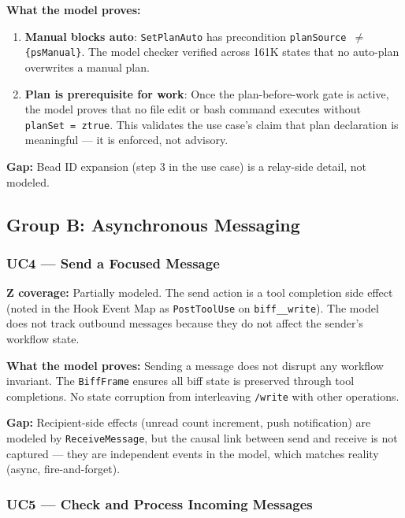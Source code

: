 \documentclass[a4paper,10pt,fleqn]{article}
\begin{document}
\textbf{What the model proves:}

\begin{enumerate}
  \item \textbf{Manual blocks auto}: \texttt{SetPlanAuto} has precondition
    \texttt{planSource $\neq$ \{psManual\}}. The model checker verified
    across 161K states that no auto-plan overwrites a manual plan.
  \item \textbf{Plan is prerequisite for work}: Once the plan-before-work
    gate is active, the model proves that no file edit or bash command
    executes without \texttt{planSet = ztrue}. This validates the use
    case's claim that plan declaration is meaningful --- it is enforced,
    not advisory.
\end{enumerate}

\textbf{Gap:} Bead ID expansion (step 3 in the use case) is a relay-side
detail, not modeled.

\subsection{Group B: Asynchronous Messaging}

\subsubsection{UC4 --- Send a Focused Message}

\textbf{Z coverage:} Partially modeled. The send action is a tool
completion side effect (noted in the Hook Event Map as
\texttt{PostToolUse} on \texttt{biff\_\_write}). The model does not
track outbound messages because they do not affect the sender's
workflow state.

\textbf{What the model proves:} Sending a message does not disrupt
any workflow invariant. The \texttt{BiffFrame} ensures all biff state
is preserved through tool completions. No state corruption from
interleaving \texttt{/write} with other operations.

\textbf{Gap:} Recipient-side effects (unread count increment, push
notification) are modeled by \texttt{ReceiveMessage}, but the causal
link between send and receive is not captured --- they are independent
events in the model, which matches reality (async, fire-and-forget).

\subsubsection{UC5 --- Check and Process Incoming Messages}
\end{document}
